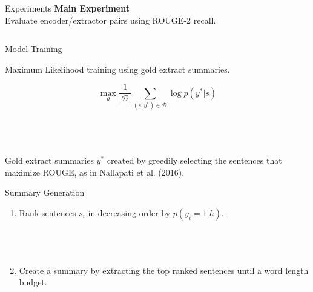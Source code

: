 \begin{frame}{Experiments}
%
    \alert<4>{\textbf{Main Experiment}}\\
    Evaluate encoder/extractor pairs using ROUGE-2 recall.\\
%
  \begin{columns}
    \begin{column}{0.3\textwidth}
      \begin{itemize}
      \end{itemize}
    \end{column}
    \begin{column}{0.7\textwidth}
         
    \end{column}
  \end{columns}
\end{frame}

\begin{frame}{Model Training}

    Maximum Likelihood training using gold extract summaries.

    \[\max_{\theta} \frac{1}{|\mathcal{D}|} \sum_{(s,y^*)\in \mathcal{D}} 
    \log p(y^*| s) \]

   
    ~\\
    ~\\
    ~\\

    Gold extract summaries $y^*$ created by greedily selecting the sentences that maximize ROUGE, as in Nallapati et al. (2016).

\end{frame}

\begin{frame}{Summary Generation}

    \begin{enumerate}
        \item Rank sentences $s_i$ in decreasing order by $p(y_i=1|h)$.
            ~\\~\\
            ~\\~\\


        \item Create a summary by extracting the top ranked sentences until a word length budget.
    \end{enumerate}

\end{frame}



